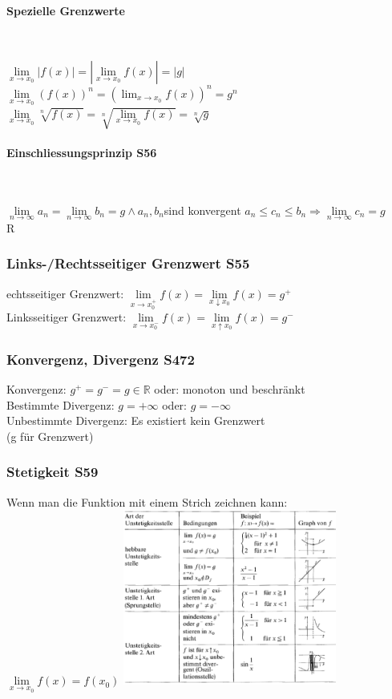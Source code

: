 \documentclass[6pt,a4paper]{scrartcl}
\begin{document}
\begin{multicols*}{2}
\paragraph{Spezielle Grenzwerte}\

$\lim\limits_{x\to x_{0}} |f(x)|=|\lim\limits_{x\to x_{0}}f(x)|=|g|$ \qquad
$\lim\limits_{x\to x_{0}} (f(x))^{n}=(\lim_{x \rightarrow x_{0}}f(x))^{n}=g^{n}$\qquad
$\lim\limits_{x\to x_{0}} \sqrt[n]{f(x)}=\sqrt[n]{\lim\limits_{x\to x_{0}}f(x)}=\sqrt[n]{g}$\\

\paragraph{Einschliessungsprinzip \color{red} S56}\

$\lim\limits_{n\to\infty} a_{n}=\lim\limits_{n\to\infty} b_{n}=g\wedge a_{n},b_{n}$sind konvergent \qquad\qquad $a_{n}\leq c_{n}\leq b_{n}\Rightarrow \lim\limits_{n\to\infty} c_{n}= g$\\


R\subsubsection{Links-/Rechtsseitiger Grenzwert \color{red}S55}echtsseitiger Grenzwert: 	$\lim\limits_{x\to x_{0}^{+}}f(x)= \lim\limits_{x\downarrow x_{0}}f(x)=g^{+}$\\
Linksseitiger Grenzwert:	$\lim\limits_{x\to x_{0}^{-}}f(x)= \lim\limits_{x\uparrow x_{0}}f(x)=g^{-}$\\

\begin{multicols}{2}
\subsubsection{Konvergenz, Divergenz \color{red}S472}
Konvergenz: $ g^{+}=g^{-}=g \in  \mathbb R $ oder: monoton und beschränkt\\
Bestimmte Divergenz: $ g=+\infty $ oder: $ g=-\infty$\\
Unbestimmte Divergenz: Es existiert kein Grenzwert\\
(g für Grenzwert)

\subsubsection{Stetigkeit \color{red}S59}
Wenn man die Funktion mit einem Strich zeichnen kann:\\
$ \lim\limits_{x\to x_{0}}f(x) = f(x_{0})$
\includegraphics[width=7cm]{Unstetig.PNG}\\


\end{multicols}
\end{multicols*}
\end{document}
